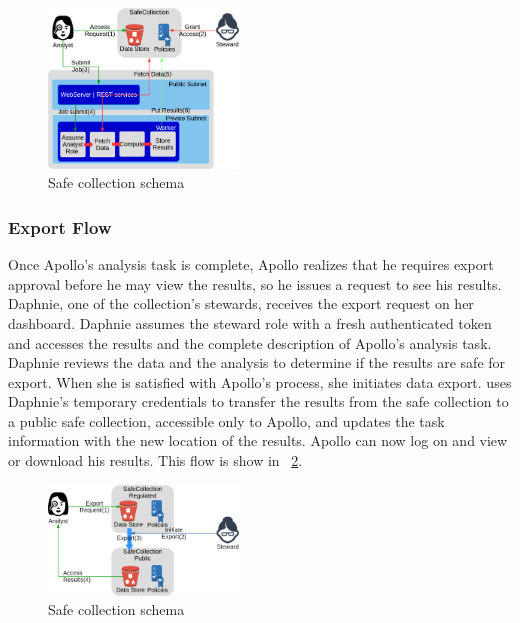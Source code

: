 \begin{figure}
  \center
  \includegraphics[width=0.45\textwidth]{figures/safe_flow.png}
  \caption{Safe collection schema}
  \label{fig:flow1}
  \vspace{-1.5em}
\end{figure}


\subsubsection{Export Flow}

Once Apollo's analysis task is complete, Apollo realizes that he requires export approval before he may view the
results, so he issues a request to see his results. Daphnie, one of the collection's stewards, receives
the export request on her dashboard. Daphnie assumes
the steward role with a fresh authenticated token and accesses the results and the complete description
of Apollo's analysis task. Daphnie reviews the data and the analysis to determine if the results are
safe for export. When she is satisfied with Apollo's process, she initiates data export. \NAME
uses Daphnie's temporary credentials to transfer the results from the safe collection to a public
safe collection, accessible only to Apollo, and updates the task information with the new location of the results. Apollo can now log on
and view or download his results. This flow is show in \figurename~\ref{fig:flow2}.

\begin{figure}
  \center
  \includegraphics[width=0.45\textwidth]{figures/export_flow.png}
  \caption{Safe collection schema}
  \label{fig:flow2}
  \vspace{-1.5em}
\end{figure}


